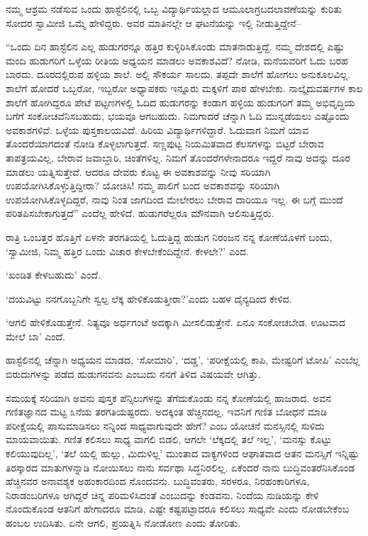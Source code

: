 ನಮ್ಮ ಆಶ್ರಮ ನಡೆಸುವ ಒಂದು ಹಾಸ್ಟೆಲಿನಲ್ಲಿ ಒಬ್ಬ ವಿದ್ಯಾರ್ಥಿಯಲ್ಲಾದ ಆಮೂಲಾಗ್ರ\break ಬದಲಾವಣೆಯನ್ನು ಕುರಿತು ಸೋದರ ಸ್ವಾಮೀಜಿ ಒಮ್ಮೆ ಹೇಳಿದ್ದರು. ಅವರ ಮಾತಿನಲ್ಲೇ ಆ ಘಟನೆಯನ್ನು ಇಲ್ಲಿ ನೀಡುತ್ತಿದ್ದೇನೆ–

“ಒಂದು ದಿನ ಹಾಸ್ಟೆಲಿನ ಎಲ್ಲ ಹುಡುಗರನ್ನೂ ಹತ್ತಿರ ಕುಳ್ಳಿರಿಸಿಕೊಂಡು ಮಾತನಾಡುತ್ತಿದ್ದೆ. ನಮ್ಮ ದೇಶದಲ್ಲಿ ಎಷ್ಟು ಮಂದಿ ಹುಡುಗರಿಗೆ ಒಳ್ಳೆಯ ರೀತಿಯ ಅಧ್ಯಯನ ಮಾಡಲು ಅವಕಾಶವಿದೆ? ನೋಡಿ, ಮನೆಯವರಿಗೆ ಓದು ಬರಹ ಬಾರದು. ದೂರದಲ್ಲಿರುವ ಹಳ್ಳಿಯ ಶಾಲೆ. ಅಲ್ಲಿ ಸೌಕರ್ಯ ಸಾಲದು. ತಪ್ಪದೇ ಶಾಲೆಗೆ ಹೋಗಲು ಅನುಕೂಲವಿಲ್ಲ. ಶಾಲೆಗೆ ಹೋದರೆ ಒಬ್ಬರೋ, ಇಬ್ಬರೋ ಅಧ್ಯಾಪಕರು ಇನ್ನೂರು ಮಕ್ಕಳಿಗೆ ಪಾಠ ಹೇಳಬೇಕು. ನಾಲ್ಕೈದು\break ವರ್ಷಗಳ ಕಾಲ ಶಾಲೆಗೆ ಹೋಗಿದ್ದರೂ ಪೇಟೆ ಪಟ್ಟಣಗಳಲ್ಲಿ ಓದಿದ ಹುಡುಗರನ್ನು ಕಂಡಾಗ ಹಳ್ಳಿಯ ಹುಡುಗರಿಗೆ ತಮ್ಮ ಅಭಿವೃದ್ಧಿಯ ಬಗೆಗೆ ಸಂಕೋಚವೆನಿಸಬಹುದು, ಭಯವೂ ಆಗಬಹುದು. ನಿಮಗಾದರೆ ಚೆನ್ನಾಗಿ ಓದಿ ಮುನ್ನಡೆಯಲು ಎಷ್ಟೊಂದು ಅವಕಾಶಗಳಿವೆ. ಒಳ್ಳೆಯ ಪುಸ್ತಕಾಲಯವಿದೆ. ಹಿರಿಯ ವಿದ್ಯಾರ್ಥಿಗಳಿದ್ದಾರೆ. ಓದುವಾಗ ನಿಮಗೆ ಯಾವ ತೊಂದರೆಯಾಗದಂತೆ ನೋಡಿ ಕೊಳ್ಳಲಾಗುತ್ತದೆ. ಸಣ್ಣಪುಟ್ಟ ನಿಯಮಿತವಾದ ಕೆಲಸಗಳನ್ನು ಬಿಟ್ಟರೆ ಬೇರಾವ ತಾಪತ್ರಯವಿಲ್ಲ, ಬೇರಾವ ಜವಾಬ್ದಾರಿ, ಚಿಂತೆಗಳಿಲ್ಲ. ನಿಮಗೆ ತೊಂದರೆಗಳೇನಾದರೂ ಇದ್ದರೆ ನಾವು ಅದನ್ನು ದೂರ ಮಾಡಲು ಯತ್ನಿಸುತ್ತೇವೆ. ಆದರೂ ದೇವರು ಕೊಟ್ಟ ಈ ಅವಕಾಶವನ್ನು ನೀವು ಸರಿಯಾಗಿ ಉಪಯೋಗಿಸಿಕೊಳ್ಳುತ್ತಿದ್ದೀರಾ? ಯೋಚಿಸಿ! ನಮ್ಮ ಪಾಲಿಗೆ ಬಂದ ಅವಕಾಶವನ್ನು ಸರಿಯಾಗಿ ಉಪಯೋಗಿಸಿಕೊಳ್ಳದಿದ್ದರೆ, ನಾವು ನಿಂತ ಜಾಗದಿಂದ ಮೇಲೇರಲು ಬೇರಾವ ದಾರಿಯೂ ಇಲ್ಲ. ಈ ಬಗ್ಗೆ ಮುಂದೆ ಪರಿತಪಿಸಬೇಕಾಗುತ್ತದೆ” ಎಂದೆಲ್ಲ ಹೇಳಿದೆ. ಹುಡುಗರೆಲ್ಲರೂ ಮೌನವಾಗಿ ಆಲಿಸುತ್ತಿದ್ದರು.

ರಾತ್ರಿ ಒಂಬತ್ತರ ಹೊತ್ತಿಗೆ ಏಳನೇ ತರಗತಿಯಲ್ಲಿ ಓದುತ್ತಿದ್ದ ಹುಡುಗ ನಿರಂಜನ ನನ್ನ ಕೋಣೆಯೊಳಗೆ ಬಂದು, ‘ಸ್ವಾಮೀಜಿ, ನಿಮ್ಮ ಹತ್ತಿರ ಒಂದು ವಿಚಾರ ಕೇಳಬೇಕೆಂದಿದ್ದೇನೆ. ಕೇಳಲೇ?’ ಎಂದ.

‘ಖಂಡಿತ ಕೇಳಬಹುದು’ ಎಂದೆ.

‘ದಯವಿಟ್ಟು ನನಗೊಬ್ಬನಿಗೇ ಸ್ವಲ್ಪ ಲೆಕ್ಕ ಹೇಳಿಕೊಡುತ್ತೀರಾ?’ಎಂದು ಬಹಳ ದೈನ್ಯದಿಂದ ಕೇಳಿದ.

‘ಆಗಲಿ ಹೇಳಿಕೊಡುತ್ತೇನೆ. ನಿತ್ಯವೂ ಅರ್ಧಗಂಟೆ ಅದಕ್ಕಾಗಿ ಮೀಸಲಿಡುತ್ತೇನೆ. ಏನೂ ಸಂಕೋಚಬೇಡ. ಊಟವಾದ ಮೇಲೆ ಬಾ’ ಎಂದೆ.

ಹಾಸ್ಟೆಲಿನಲ್ಲಿ ಚೆನ್ನಾಗಿ ಅಧ್ಯಯನ ಮಾಡದ, ‘ಸೋಮಾರಿ’, ‘ದಡ್ಡ’, ‘ಪರೀಕ್ಷೆಯಲ್ಲಿ ಕಾಪಿ, ಮೇಷ್ಟರಿಗೆ ಟೋಪಿ’ ಎಂಬೆಲ್ಲ ಬಿರುದುಗಳನ್ನು ಪಡೆದ ಹುಡುಗನವನು ಎಂಬುದು ನನಗೆ ತಿಳಿದ ವಿಷಯವೇ ಆಗಿತ್ತು.

ಸಮಯಕ್ಕೆ ಸರಿಯಾಗಿ ಅವನು ಪುಸ್ತಕ ಪೆನ್ಸಿಲುಗಳನ್ನು ತೆಗೆದುಕೊಂಡು ನನ್ನ ಕೋಣೆಯಲ್ಲಿ ಹಾಜರಾದ. ಅವನ ಗಣಿತಜ್ಞಾನದ ಮಟ್ಟ ೩ನೆಯ ತರಗತಿಯಷ್ಟರದು. ಅದಕ್ಕಿಂತ ಹೆಚ್ಚಿನದಲ್ಲ. ಇವನಿಗೆ ಗಣಿತ ಬೋಧನೆ ಮಾಡಿ ಪರೀಕ್ಷೆಯಲ್ಲಿ ಪಾಸುಮಾಡಿಸಲು ನನ್ನಿಂದ ಸಾಧ್ಯವಾಗುವುದೇ ಹೇಗೆ? ಎಂಬ ಯೋಚನೆ ಮನಸ್ಸಿನಲ್ಲಿ ಸುಳಿದು ಮಾಯವಾಯಿತು. ಗಣಿತ ಕಲಿಸಲು ಸಾಧ್ಯ ವಾಗಲಿ ಬಿಡಲಿ, ಆಗಲೇ ‘ಲೆಕ್ಕದಲ್ಲಿ ತಲೆ ಇಲ್ಲ’, ‘ಮನಸ್ಸು ಕೊಟ್ಟು ಕಲಿಯುವುದಿಲ್ಲ’, ‘ತಲೆ ಯಲ್ಲಿ ಹುಲ್ಲು, ಮಿದುಳಿಲ್ಲ’ ಮುಂತಾದ ವಾಕ್ಯಗಳಿಂದ ಆಘಾತವಾದ ಆತನ ಮನಸ್ಸಿಗೆ ಇನ್ನಿಷ್ಟು ತಿರಸ್ಕಾರದ ಮಾತುಗಳನ್ನಾಡಿ ನೋಯಿಸಲು ನಾನು ಸರ್ವಥಾ ಸಿದ್ಧನಿರಲಿಲ್ಲ. ಏಕೆಂದರೆ ನಾನು ಬುದ್ಧಿವಂತರೆನಿಸಿಕೊಂಡ ಹೆಚ್ಚಿನವರ ಅನಾವಶ್ಯಕ ಅಹಂಕಾರದಿಂದ ನೊಂದವನು. ಬುದ್ಧಿವಂತರು, ಸರಳರೂ, ನಿರಹಂಕಾರಿಗಳೂ, ನಿರಾಡಂಬರಿಗಳೂ ಆಗಿದ್ದರೆ ಚಿನ್ನ ಪರಿಮಳಿಸಿದಂತೆ ಎಂಬುದನ್ನು ಕಂಡವನು. ನಿಂದೆಯ ನುಡಿಯನ್ನು ಕೇಳಿ ನೊಂದುಕೊಂಡ ಆತನಿಗೆ ಹೇಗಾದರೂ ಮಾಡಿ, ಎಷ್ಟೇ ಕಷ್ಟಪಟ್ಟಾದರೂ ಕಲಿಸಲು ಸಾಧ್ಯವೇ ಎಂದು ನೋಡಬೇಕೆಂಬ ಹಂಬಲ ಉದಿಸಿತು. ಏನೇ ಆಗಲಿ, ಪ್ರಯತ್ನಿಸಿ ನೋಡೋಣ ಎಂದು ತೋರಿತು.

